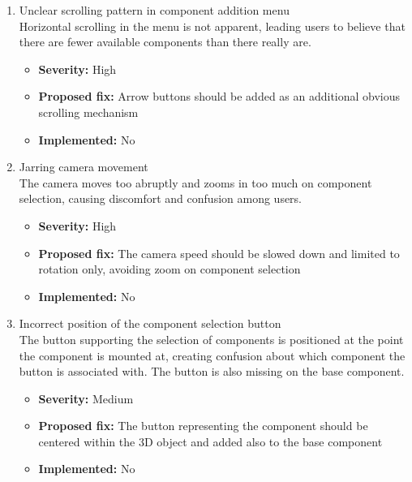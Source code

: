 \begin{enumerate}[label=\textbf{I\arabic*:}, leftmargin=*]
    \item Unclear scrolling pattern in component addition menu
        \vspace{2pt}
        \\Horizontal scrolling in the menu is not apparent, leading users to believe that there are fewer available components than there really are.
        \begin{itemize}[noitemsep, label=\trianglebullet]
            \item \textbf{Severity:} High
            \item \textbf{Proposed fix:} Arrow buttons should be added as an additional obvious scrolling mechanism
            \item \textbf{Implemented:} No
        \end{itemize}
        \vspace{4pt}

    \item Jarring camera movement
        \vspace{2pt}
        \\The camera moves too abruptly and zooms in too much on component selection, causing discomfort and confusion among users.
        \begin{itemize}[noitemsep, label=\trianglebullet]
            \item \textbf{Severity:} High
            \item \textbf{Proposed fix:} The camera speed should be slowed down and limited to rotation only, avoiding zoom on component selection
            \item \textbf{Implemented:} No
        \end{itemize}
        \vspace{4pt}

    \item Incorrect position of the component selection button
        \vspace{2pt}
        \\The button supporting the selection of components is positioned at the point the component is mounted at, creating confusion about which component the button is associated with. The button is also missing on the base component.
        \begin{itemize}[noitemsep, label=\trianglebullet]
            \item \textbf{Severity:} Medium
            \item \textbf{Proposed fix:} The button representing the component should be centered within the 3D object and added also to the base component
            \item \textbf{Implemented:} No
        \end{itemize}
        \vspace{4pt}


\end{enumerate}
